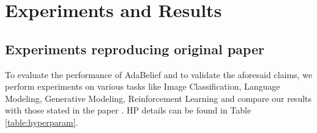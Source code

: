\section{Experiments and Results}

\label{sec:results}


\subsection{Experiments reproducing original paper}
\label{lab:Results}
To evaluate the performance of AdaBelief and to validate the aforesaid claims, we perform experiments on various tasks like Image Classification, Language Modeling, Generative Modeling, Reinforcement Learning and compare our results with those stated in the paper \cite{zhuang_adabelief_2020}. HP details can be found in Table \ref{table:hyperparam}.


